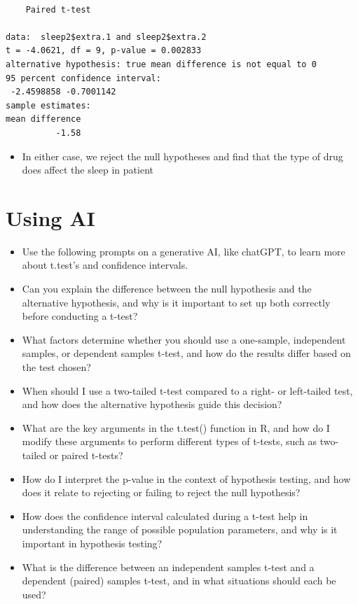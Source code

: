\documentclass[
  letterpaper,
  DIV=11,
  numbers=noendperiod]{scrreprt}
\providecommand{\tightlist}{%
  \setlength{\itemsep}{0pt}\setlength{\parskip}{0pt}}\usepackage{longtable,booktabs,array}
\begin{document}
\begin{verbatim}

    Paired t-test

data:  sleep2$extra.1 and sleep2$extra.2
t = -4.0621, df = 9, p-value = 0.002833
alternative hypothesis: true mean difference is not equal to 0
95 percent confidence interval:
 -2.4598858 -0.7001142
sample estimates:
mean difference 
          -1.58 
\end{verbatim}

\begin{itemize}
\tightlist
\item
  In either case, we reject the null hypotheses and find that the type
  of drug does affect the sleep in patient
\end{itemize}

\section{Using AI}\label{using-ai-4}

\begin{itemize}
\item
  Use the following prompts on a generative AI, like chatGPT, to learn
  more about t.test's and confidence intervals.
\item
  Can you explain the difference between the null hypothesis and the
  alternative hypothesis, and why is it important to set up both
  correctly before conducting a t-test?
\item
  What factors determine whether you should use a one-sample,
  independent samples, or dependent samples t-test, and how do the
  results differ based on the test chosen?
\item
  When should I use a two-tailed t-test compared to a right- or
  left-tailed test, and how does the alternative hypothesis guide this
  decision?
\item
  What are the key arguments in the t.test() function in R, and how do I
  modify these arguments to perform different types of t-tests, such as
  two-tailed or paired t-tests?
\item
  How do I interpret the p-value in the context of hypothesis testing,
  and how does it relate to rejecting or failing to reject the null
  hypothesis?
\item
  How does the confidence interval calculated during a t-test help in
  understanding the range of possible population parameters, and why is
  it important in hypothesis testing?
\item
  What is the difference between an independent samples t-test and a
  dependent (paired) samples t-test, and in what situations should each
  be used?
\end{itemize}
\end{document}
